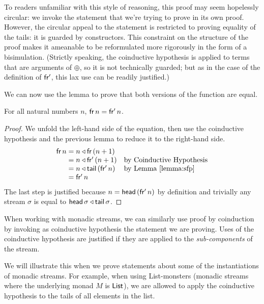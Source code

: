 To readers unfamiliar with this style of reasoning, this proof may seem hopelessly circular: we invoke the statement that we're trying to prove in its own proof.
However, the circular appeal to the statement is restricted to proving equality of the tails: it is guarded by constructors. 
This constraint on the structure of the proof makes it ameanable to be reformulated more rigorously in the form of a bisimulation.
(Strictly speaking, the coinductive hypothesis is applied to terms that are arguments of $\oplus$, so it is not technically guarded; but as in the case of the definition of $\mathsf{fr'}$, this lax use can be readily justified.)

We can now use the lemma to prove that both versions of the function are equal.
\begin{theorem}
For all natural numbers $n$, $\mathsf{fr}\,n = \mathsf{fr'}\,n$.
\end{theorem}
\begin{proof}
We unfold the left-hand side of the equation, then use the coinductive hypothesis and the previous lemma to reduce it to the right-hand side.
$$
\begin{array}{r@{{}={}}ll}
\sfr\,n
& n \scons \sfr\,(n+1)\\
& n \scons \sfp\,(n+1) & \mbox{by Coinductive Hypothesis}\\
& n \scons \tail\,(\sfp\,n) & \mbox{by Lemma \ref{lemma:sfp}}\\
& \sfp\,n
\end{array}
$$
The last step is justified because $n = \mathsf{head}\,(\mathsf{fr'}\,n)$ by definition and trivially any stream $\sigma$ is equal to $\mathsf{head}\,\sigma \triangleleft \mathsf{tail}\,\sigma$.
\end{proof}

When working with monadic streams, we can similarly use proof by coinduction by invoking as coinductive hypothesis the statement we are proving.
Uses of the coinductive hypothesis are justified if they are applied to the {\em sub-components} of the stream.

We will illustrate this when we prove statements about some of the instantiations of monadic streams.
For example, when using List-monsters (monadic streams where the underlying monad $M$ is $\mathsf{List}$), we are allowed to apply the coinductive hypothesis to the tails of all elements in the list.
